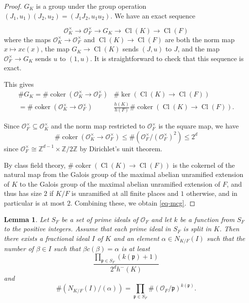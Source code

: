 \documentclass[12pt]{amsart}
\newtheorem{lemma}[theo]{Lemma}
\theoremstyle{remark}
\theoremstyle{definition}
\begin{document}
\begin{proof} $G_K$ is a group under the group operation $(J_1, u_1) (J_2, u_2)=(J_1J_2,u_1u_2)$. We have an exact sequence

\[ \mathcal O_K^\times \to  \mathcal O_F^\times \to G_K \to \operatorname{Cl}(K) \to \operatorname{Cl}(F)  \]
where the maps $\mathcal O_K^\times \to \mathcal O_F^\times$ and $\operatorname{Cl}(K) \to \operatorname{Cl}(F)  $ are both the norm map $x \mapsto x c(x)$, the map $G_K \to \operatorname{Cl}(K) $ sends $(J,u)$ to $J$, and the map $ \mathcal O_F^\times \to G_K$ sends $u$ to $(1,u)$. It is straightforward to check that this sequence is exact.

This gives \begin{equation*}\begin{aligned} \#G_K= \# \operatorname{coker}( \mathcal O_K^\times \to  \mathcal O_F^\times ) & \#{\operatorname{ker} ( \operatorname{Cl}(K) \to \operatorname{Cl}(F))} \\ =  \#{ \operatorname{coker}( \mathcal O_K^\times \to  \mathcal O_F^\times )}& \frac{h(K)}{h(F)} \#{\operatorname{coker} ( \operatorname{Cl}(K) \to \operatorname{Cl}(F))}. \end{aligned}\end{equation*}

Since $\mathcal O_F^\times \subseteq \mathcal O_K^\times$  and the norm map restricted to $\mathcal O_F^\times$ is the square map, we have
\[  \#{ \operatorname{coker}( \mathcal O_K^\times \to  \mathcal O_F^\times )}  \leq  \# (  \mathcal O_F^\times/ (  \mathcal O_F^\times)^2) \leq 2^d \]
since $\mathcal O_F^\times \cong \mathbb Z^{d-1} \times \mathbb Z/2\mathbb Z$ by Dirichlet's unit theorem.

By class field theory, $\#{\operatorname{coker} ( \operatorname{Cl}(K) \to \operatorname{Cl}(F))} $ is the cokernel of the natural map from the Galois group of the maximal abelian unramified extension of $K$ to the Galois group of the maximal abelian unramified extension of $F$, and thus has size $2$ if $K/F$ is unramified at all finite places and $1$ otherwise, and in particular is at most $2$. Combining these, we obtain \eqref{eq-mcg}. \end{proof}



\begin{lemma}\label{ideal-from-primes} Let $S_F$ be a set of prime ideals of $\mathcal O_F$ and let $k$ be a function from $S_F$ to the positive integers. Assume that each prime ideal in $S_F$ is split in $K$. Then there exists a fractional ideal $I$ of $K$ and an element $\alpha \in N_{K/F}(I)$ such that the number of $\beta \in I$ such that $\beta c(\beta)=\alpha$ is at least \[ \frac{ \prod_{\mathfrak p \in S_F} (k(\mathfrak p)+1  )}{ 2^d h^{-}(K)} \] and  
\[ \# (N_{K/F}(I)/(\alpha)) = \prod_{\mathfrak p\in S_F} \# (\mathcal O_F/\mathfrak p)^{k(\mathfrak p)}.\] \end{lemma}
\end{document}
